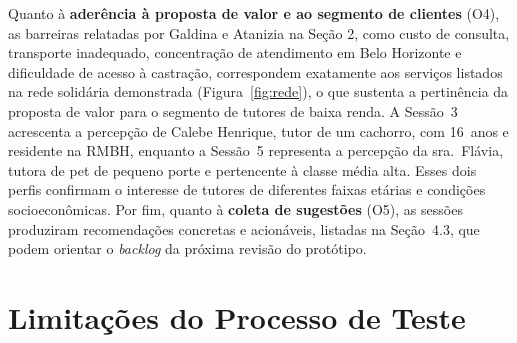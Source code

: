 \documentclass[
    12pt,
    openright,
    oneside,
    a4paper
]{abntex2}
\begin{document}
Quanto à \textbf{aderência à proposta de valor e ao segmento de clientes} (O4), as barreiras relatadas por Galdina e Atanizia na Seção 2, como custo de consulta,
transporte inadequado, concentração de atendimento em Belo Horizonte e dificuldade de acesso
à castração, correspondem exatamente aos serviços listados na rede solidária demonstrada
(Figura~\ref{fig:rede}), o que sustenta a pertinência da proposta de valor para o segmento de
tutores de baixa renda. A Sessão~3 acrescenta a percepção de Calebe Henrique, tutor de um
cachorro, com 16~anos e residente na RMBH, enquanto a Sessão~5 representa a percepção da
sra.~Flávia, tutora de pet de pequeno porte e pertencente à classe média alta. Esses dois
perfis confirmam o interesse de tutores de diferentes faixas etárias e condições
socioeconômicas. Por fim, quanto à \textbf{coleta de sugestões} (O5), as sessões produziram
recomendações concretas e acionáveis, listadas na Seção~4.3, que podem orientar o
\textit{backlog} da próxima revisão do protótipo.

\chapter{Limitações do Processo de Teste}
\label{sec:limitacoes}
\end{document}
